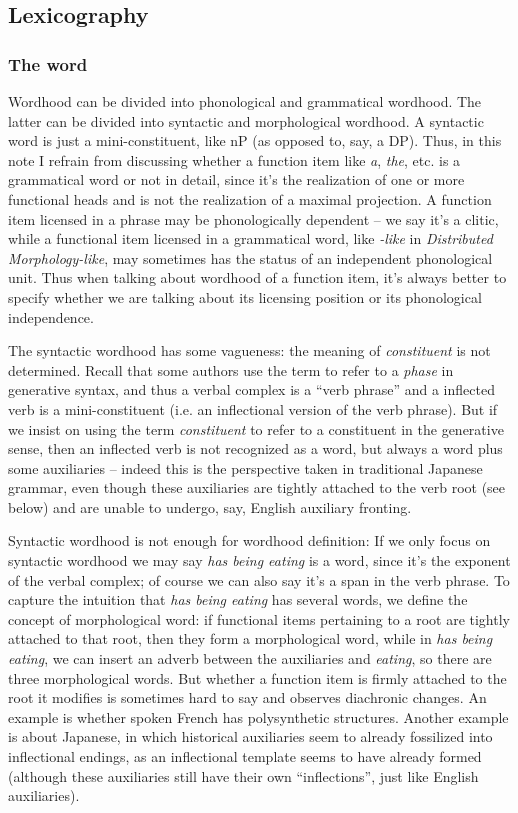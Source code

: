 \documentclass[UTF8, a4paper, oneside, scheme=plain, 12pt]{ctexbook}
\newcommand*{\term}[1]{\emph{#1}}
\newcommand{\form}[1]{\emph{#1}}
\begin{document}
{\subsection{Lexicography}

\subsubsection{The word}\label{sec:theory.word}

Wordhood can be divided into phonological and grammatical wordhood.
The latter can be divided into syntactic and morphological wordhood.
A syntactic word is just a mini-constituent,
like nP (as opposed to, say, a DP).
Thus, in this note I refrain from discussing whether a function item 
like \form{a}, \form{the}, etc. 
is a grammatical word or not in detail,
since it's the realization of one or more functional heads
and is not the realization of a maximal projection.
A function item licensed in a phrase
may be phonologically dependent -- we say it's a clitic,
while a functional item licensed in a grammatical word, 
like \form{-like} in \form{Distributed Morphology-like},
may sometimes has the status of an independent phonological unit.
Thus when talking about wordhood of a function item,
it's always better to specify whether we are talking about its 
licensing position or its phonological independence.

The syntactic wordhood has some vagueness:
the meaning of \term{constituent} is not determined.
Recall that some authors use the term to refer to a \emph{phase} in generative syntax,
and thus a verbal complex is a ``verb phrase'' 
and a inflected verb is a mini-constituent (i.e. an inflectional version of the verb phrase).
But if we insist on using the term \term{constituent} 
to refer to a constituent in the generative sense, 
then an inflected verb is not recognized as a word, 
but always a word plus some auxiliaries -- 
indeed this is the perspective taken in traditional Japanese grammar,
even though these auxiliaries are tightly attached to the verb root (see below)
and are unable to undergo, say, English auxiliary fronting.

Syntactic wordhood is not enough for wordhood definition:
If we only focus on syntactic wordhood 
we may say \form{has being eating} is a word,
since it's the exponent of the verbal complex;
of course we can also say it's a span in the verb phrase.
To capture the intuition that \form{has being eating} has several words, 
we define the concept of morphological word:
if functional items pertaining to a root 
are tightly attached to that root, 
then they form a morphological word,
while in \form{has being eating},
we can insert an adverb between the auxiliaries and \form{eating},
so there are three morphological words.
But whether a function item is firmly attached to the root it modifies is sometimes hard to say 
and observes diachronic changes. 
An example is whether spoken French has polysynthetic structures.
Another example is about Japanese, 
in which historical auxiliaries seem to already fossilized into inflectional endings,
as an inflectional template seems to have already formed
(although these auxiliaries still have their own ``inflections'',
just like English auxiliaries).

}
\end{document}
